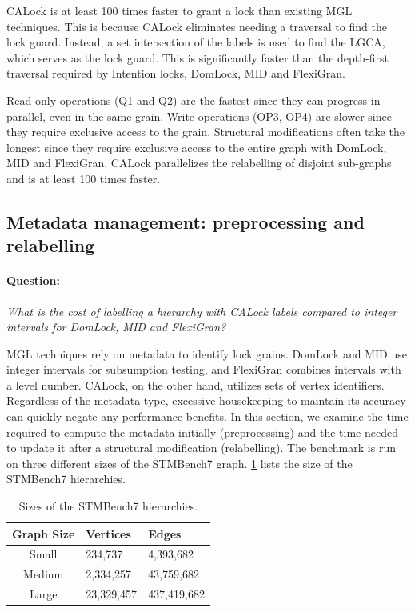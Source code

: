 CALock is at least 100 times faster to grant a lock than existing MGL techniques. This is because CALock eliminates needing a traversal to find the lock guard. Instead, a set intersection of the labels is used to find the LGCA, which serves as the lock guard. This is significantly faster than the depth-first traversal required by Intention locks, DomLock, MID and FlexiGran.

Read-only operations (Q1 and Q2) are the fastest since they can progress in parallel, even in the same grain. 
Write operations (OP3, OP4) are slower since they require exclusive access to the grain. Structural modifications often take the longest since they require exclusive access to the entire graph with DomLock, MID and FlexiGran. CALock parallelizes the relabelling of disjoint sub-graphs and is at least 100 times faster. 



\subsection{Metadata management: preprocessing and relabelling} \label
{benchmark:labellingAndRelabelling}
 
\paragraph{Question:} \emph{What is the cost of labelling a hierarchy with CALock labels compared to integer intervals for DomLock, MID and FlexiGran?}

MGL techniques rely on metadata to identify lock grains. DomLock and MID use integer intervals for subsumption testing, and FlexiGran combines intervals with a level number. CALock, on the other hand, utilizes sets of vertex identifiers. Regardless of the metadata type, excessive housekeeping to maintain its accuracy can quickly negate any performance benefits. In this section, we examine the time required to compute the metadata initially (preprocessing) and the time needed to update it after a structural modification (relabelling). The benchmark is run on three different sizes of the STMBench7 graph. \cref{tab:graphSizes} lists the size of the STMBench7 hierarchies.

\begin{table}[h]
	\centering
	\captionsetup{justification=centering}
	\begin{tabular}{c|ll}
		\textbf{Graph Size} & \textbf{Vertices} & \textbf{Edges} \\ \hline
		Small  & 234,737 	& 4,393,682 	\\
		Medium & 2,334,257 	& 43,759,682	\\
		Large  & 23,329,457 & 437,419,682 	\\
	\end{tabular}
	\caption{Sizes of the STMBench7 hierarchies.}
	\label{tab:graphSizes}
\end{table}


